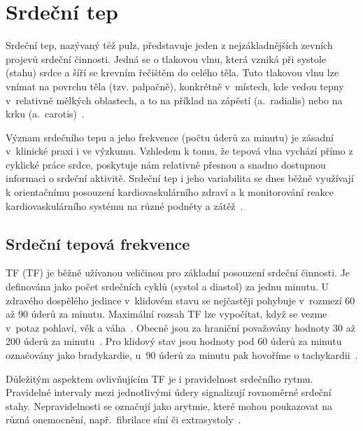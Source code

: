 \chapter{Srdeční tep}
\label{chap:srdecni_tep}

Srdeční tep, nazývaný též pulz, představuje jeden z nejzákladnějších zevních projevů srdeční činnosti.
Jedná se o tlakovou vlnu, která vzniká při systole (stahu) srdce a šíří se krevním řečištěm do celého těla.
Tuto tlakovou vlnu lze vnímat na povrchu těla (tzv. palpačně), konkrétně v~místech, kde vedou tepny v~relativně mělkých oblastech, a to na příklad na zápěstí (a.~radialis) nebo na krku (a.~carotis)~\cite{ENIKÖ, ucebniceFyziologie}.

Význam srdečního tepu a jeho frekvence (počtu úderů za minutu) je zásadní v~klinické praxi i ve výzkumu.
Vzhledem k tomu, že tepová vlna vychází přímo z cyklické práce srdce, poskytuje nám relativně přesnou a snadno dostupnou informaci o srdeční aktivitě.
Srdeční tep i jeho variabilita se dnes běžně využívají k orientačnímu posouzení kardiovaskulárního zdraví a k monitorování reakce kardiovaskulárního systému na různé podněty a zátěž~\cite{faktoryOvlivnujiciTep}.

\section{Srdeční tepová frekvence}
\label{sec:STF}

\acl{TF} (\acs{TF}) je běžně užívanou veličinou pro základní posouzení srdeční činnosti.
Je definována jako počet srdečních cyklů (systol a diastol) za jednu minutu.
U zdravého dospělého jedince v~klidovém stavu se nejčastěji pohybuje v~rozmezí 60 až 90 úderů za minutu.
Maximální rozsah \acs{TF} lze vypočítat, když se vezme v~potaz pohlaví, věk a váha~\cite{ENIKÖ}. 
Obecně jsou za hraniční považovány hodnoty 30 až 200 úderů za minutu~\cite{PyPPG}.
Pro klidový stav jsou hodnoty pod 60 úderů za minutu označovány jako bradykardie, u~90 úderů za minutu pak hovoříme o tachykardii~\cite{ENIKÖ, vnitrniLekarstviVKostce}.

Důležitým aspektem ovlivňujícím \acs{TF} je i pravidelnost srdečního rytmu.
Pravidelné intervaly mezi jednotlivými údery signalizují rovnoměrné srdeční stahy.
Nepravidelnosti se označují jako arytmie, které mohou poukazovat na různá onemocnění, např.~fibrilace síní či extrasystoly~\cite{ENIKÖ}.

